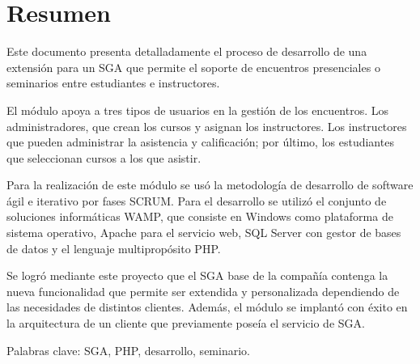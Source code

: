 \chapter*{Resumen}

Este documento presenta detalladamente el proceso de desarrollo de una extensión para un \gls{SGA} que permite el soporte de encuentros presenciales o seminarios entre estudiantes e instructores. 

El módulo apoya a tres tipos de usuarios en la gestión de los encuentros. Los administradores, que crean los cursos y asignan los instructores. Los instructores que pueden administrar la asistencia y calificación; por último, los estudiantes que seleccionan cursos a los que asistir.

Para la realización de este módulo se usó la metodología de desarrollo de software ágil e iterativo por fases SCRUM. Para el desarrollo se utilizó el conjunto de soluciones informáticas \gls{WAMP}, que consiste en Windows como plataforma de sistema operativo, Apache para el servicio web, \gls{SQL} Server con gestor de bases de datos y el lenguaje multipropósito PHP.

Se logró mediante este proyecto que el SGA base de la compañía contenga la nueva funcionalidad que permite ser extendida y personalizada dependiendo de las necesidades de distintos clientes. Además, el módulo se implantó con éxito en la arquitectura de un cliente que previamente poseía el servicio de \gls{SGA}.

Palabras clave: \gls{SGA}, \gls{PHP}, desarrollo, seminario.




